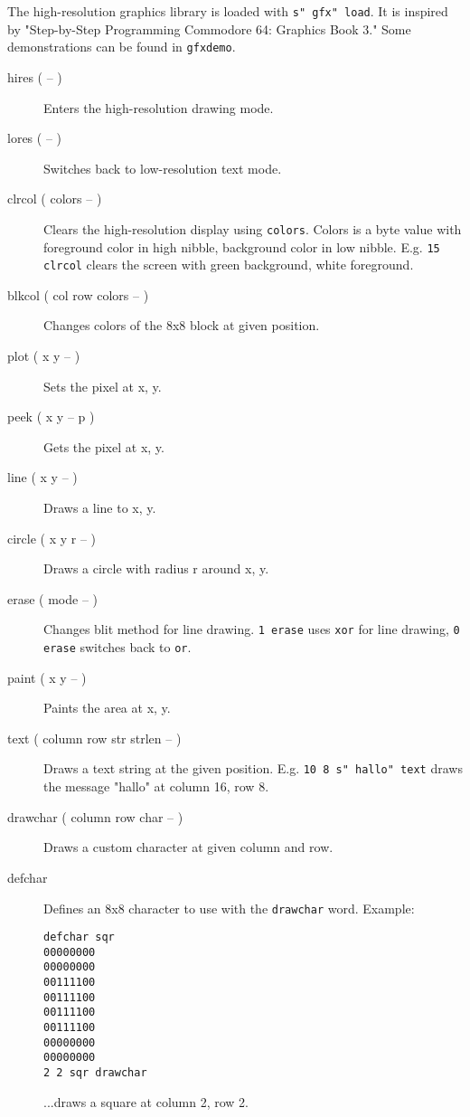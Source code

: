 The high-resolution graphics library is loaded with \texttt{s" gfx" load}. 
It is inspired by "Step-by-Step Programming Commodore 64: Graphics Book 3."
Some demonstrations can be found in \texttt{gfxdemo}. 
\begin{description}
\item[hires ( -- )] Enters the high-resolution drawing mode.
\item[lores ( -- )] Switches back to low-resolution text mode.
\item[clrcol ( colors -- )] Clears the high-resolution display using \texttt{colors}. Colors is a
byte value with foreground color in high nibble, background color in low nibble. E.g. \texttt{15
clrcol} clears the screen with green background, white foreground.
\item[blkcol ( col row colors -- )] Changes colors of the 8x8 block at given position.
\item[plot ( x y -- )] Sets the pixel at x, y.
\item[peek ( x y -- p )] Gets the pixel at x, y.
\item[line ( x y -- )] Draws a line to x, y.
\item[circle ( x y r -- )] Draws a circle with radius r around x, y.
\item[erase ( mode -- )] Changes blit method for line drawing. \texttt{1 erase} uses \texttt{xor}
for line drawing, \texttt{0 erase} switches back to \texttt{or}.
\item[paint ( x y -- )] Paints the area at x, y.
\item[text ( column row str strlen -- )] Draws a text string at the given position. E.g. \texttt{10
8 s" hallo" text} draws the message "hallo" at column 16, row 8.
\item[drawchar ( column row char -- )] Draws a custom character at given column and row.
\item[defchar] Defines an 8x8 character to use with the \texttt{drawchar} word. Example:

\begin{verbatim}
defchar sqr
00000000
00000000
00111100
00111100
00111100
00111100
00000000
00000000
2 2 sqr drawchar
\end{verbatim}

...draws a square at column 2, row 2.
\end{description}
